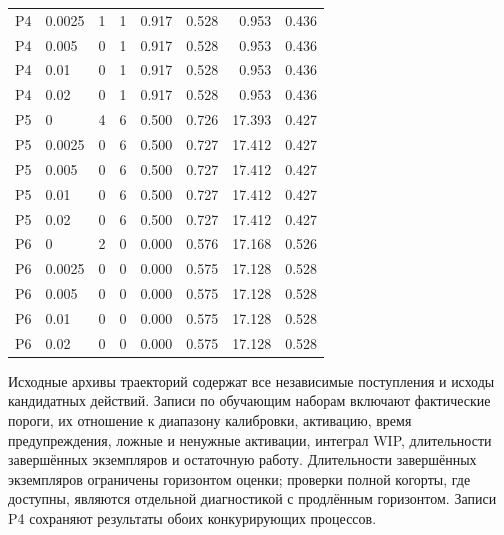 \begin{longtable}{llrrrrrr}
P4 & 0.0025 & 1 & 1 & 0.917 & 0.528 & 0.953 & 0.436\\

P4 & 0.005 & 0 & 1 & 0.917 & 0.528 & 0.953 & 0.436\\

P4 & 0.01 & 0 & 1 & 0.917 & 0.528 & 0.953 & 0.436\\

P4 & 0.02 & 0 & 1 & 0.917 & 0.528 & 0.953 & 0.436\\

P5 & 0 & 4 & 6 & 0.500 & 0.726 & 17.393 & 0.427\\

P5 & 0.0025 & 0 & 6 & 0.500 & 0.727 & 17.412 & 0.427\\

P5 & 0.005 & 0 & 6 & 0.500 & 0.727 & 17.412 & 0.427\\

P5 & 0.01 & 0 & 6 & 0.500 & 0.727 & 17.412 & 0.427\\

P5 & 0.02 & 0 & 6 & 0.500 & 0.727 & 17.412 & 0.427\\

P6 & 0 & 2 & 0 & 0.000 & 0.576 & 17.168 & 0.526\\

P6 & 0.0025 & 0 & 0 & 0.000 & 0.575 & 17.128 & 0.528\\

P6 & 0.005 & 0 & 0 & 0.000 & 0.575 & 17.128 & 0.528\\

P6 & 0.01 & 0 & 0 & 0.000 & 0.575 & 17.128 & 0.528\\

P6 & 0.02 & 0 & 0 & 0.000 & 0.575 & 17.128 & 0.528\\

\bottomrule\end{longtable}\endgroup

Исходные архивы траекторий содержат все независимые поступления и исходы кандидатных действий. Записи по обучающим наборам включают фактические пороги, их отношение к диапазону калибровки, активацию, время предупреждения, ложные и ненужные активации, интеграл WIP, длительности завершённых экземпляров и остаточную работу. Длительности завершённых экземпляров ограничены горизонтом оценки; проверки полной когорты, где доступны, являются отдельной диагностикой с продлённым горизонтом. Записи P4 сохраняют результаты обоих конкурирующих процессов.


